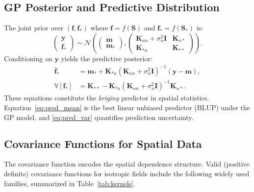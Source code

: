 \documentclass[conference]{IEEEtran}
\begin{document}
\subsection{GP Posterior and Predictive Distribution}

The joint prior over $(\mathbf{f}, \mathbf{f}_*)$ where $\mathbf{f} = f(\mathbf{S})$ and $\mathbf{f}_* = f(\mathbf{S}_*)$ is:
\begin{equation}
\begin{pmatrix} \mathbf{y} \\ \mathbf{f}_* \end{pmatrix}
\sim \mathcal{N}\!\left(
\begin{pmatrix} \mathbf{m} \\ \mathbf{m}_* \end{pmatrix},
\begin{pmatrix} \mathbf{K}_{nn} + \sigma_n^2\mathbf{I} & \mathbf{K}_{n*} \\ \mathbf{K}_{*n} & \mathbf{K}_{**} \end{pmatrix}
\right).
\label{eq:joint_prior}
\end{equation}
Conditioning on $\mathbf{y}$ yields the predictive posterior:
\begin{align}
  \bar{\mathbf{f}}_* &= \mathbf{m}_* + \mathbf{K}_{*n}(\mathbf{K}_{nn} + \sigma_n^2\mathbf{I})^{-1}(\mathbf{y} - \mathbf{m}), \label{eq:pred_mean}\\
  \mathbb{V}[\mathbf{f}_*] &= \mathbf{K}_{**} - \mathbf{K}_{*n}(\mathbf{K}_{nn} + \sigma_n^2\mathbf{I})^{-1}\mathbf{K}_{n*}. \label{eq:pred_var}
\end{align}
These equations constitute the \emph{kriging} predictor in spatial statistics. Equation~\eqref{eq:pred_mean} is the best linear unbiased predictor (BLUP) under the GP model, and \eqref{eq:pred_var} quantifies prediction uncertainty.

\subsection{Covariance Functions for Spatial Data}

The covariance function encodes the spatial dependence structure. Valid (positive definite) covariance functions for isotropic fields include the following widely used families, summarized in Table~\ref{tab:kernels}.
\end{document}
